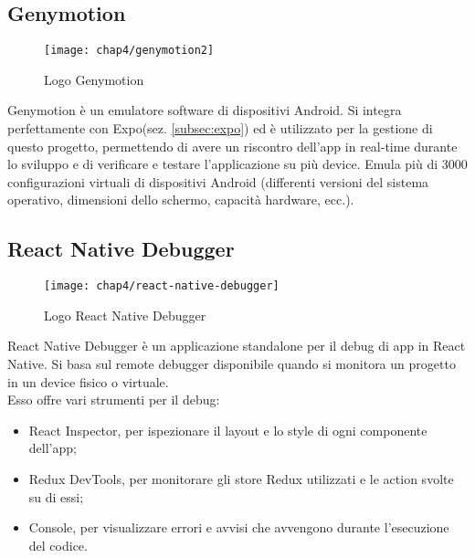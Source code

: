 \subsection{Genymotion}
\begin{figure}[H] 
	\centering
	\texttt{[image: chap4/genymotion2]}
	\caption{Logo Genymotion}
\end{figure}
Genymotion è un emulatore software di dispositivi Android. Si integra perfettamente con Expo(sez. \ref{subsec:expo}) ed è utilizzato per la gestione di questo progetto, permettendo di avere un riscontro dell'app in real-time durante lo sviluppo e di verificare e testare l'applicazione su più device. Emula più di 3000 configurazioni virtuali di dispositivi Android (differenti versioni del sistema operativo, dimensioni dello schermo, capacità hardware, ecc.).

\subsection{React Native Debugger}
\begin{figure}[H] 
	\centering
	\texttt{[image: chap4/react-native-debugger]}
	\caption{Logo React Native Debugger}
\end{figure}
React Native Debugger è un applicazione standalone per il debug di app in React Native. Si basa sul remote debugger disponibile quando si monitora un progetto in un device fisico o virtuale.\\ Esso offre vari strumenti per il debug:
\begin{itemize}
	\item React Inspector, per ispezionare il layout e lo style di ogni componente dell'app;
	\item Redux DevTools, per monitorare gli store Redux utilizzati e le action svolte su di essi;
	\item Console, per visualizzare errori e avvisi che avvengono durante l'esecuzione del codice.
\end{itemize}

